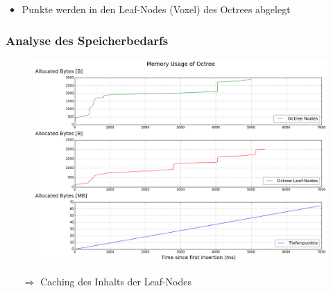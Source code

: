 \documentclass[presentation]{beamer}
\begin{document}
\begin{frame}
\begin{itemize}%
	\item Punkte werden in den Leaf-Nodes (Voxel) des Octrees abgelegt 
\end{itemize}

\end{frame}

\begin{frame}
\frametitle{Analyse des Speicherbedarfs}
\begin{figure}
\centering
\includegraphics[width=0.8\linewidth]{figures/Benchmark_withoutCaching.png}
\label{fig:BenchmarkWithoutCaching} 
\end{figure}
\baselineskip%
\begin{itemize}
	\item [$\Rightarrow$] Caching des Inhalts der Leaf-Nodes
\end{itemize} 
\end{frame} 
\end{document}
